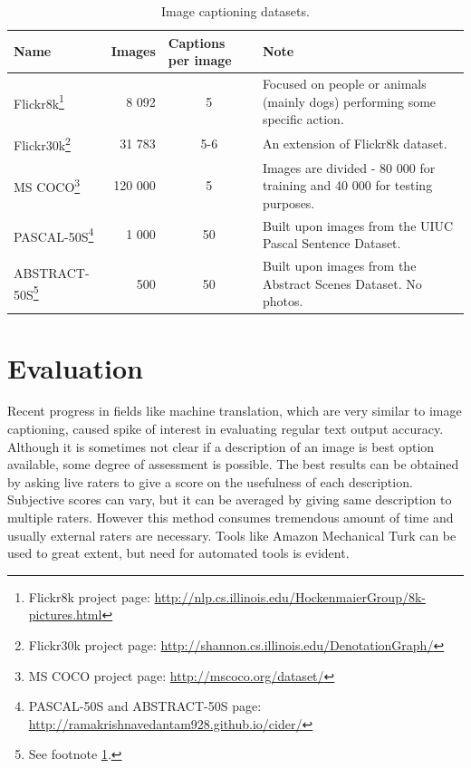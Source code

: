 \begin{center}
	\begin{longtable}{|l|m{2cm}|m{2cm}|m{4.7cm}|}			
		\caption{Image captioning datasets.} \label{tab:datasets} \\

	   	\hline
	   	\multicolumn{1}{|l|}{\textbf{Name}} & 
	   	\textbf{Images} & 
	   	\textbf{Captions per image} & 
	   	\textbf{Note} \\
	   	\hline \hline
		\endhead
		
	   	Flickr8k\footnote{Flickr8k project page: \url{http://nlp.cs.illinois.edu/HockenmaierGroup/8k-pictures.html}} &
		   	\multicolumn{1}{r|}{8 092} &
		   	\multicolumn{1}{c|}{5} &
		   	Focused on people or animals (mainly dogs) performing some specific action. \\ \hline
	   	Flickr30k\footnote{Flickr30k project page: \url{http://shannon.cs.illinois.edu/DenotationGraph/}} & 
		   	\multicolumn{1}{r|}{31 783} &
		   	\multicolumn{1}{c|}{5-6} &
		   	An extension of Flickr8k dataset. \\ \hline
	   	MS COCO\footnote{MS COCO project page: \url{http://mscoco.org/dataset/}} &
		   	\multicolumn{1}{r|}{120 000} &
		   	\multicolumn{1}{c|}{5} &
		   	Images are divided - 80 000 for training and 40 000 for testing purposes. \\ \hline
	   	PASCAL-50S\footnote{\label{ft:cider}PASCAL-50S and ABSTRACT-50S page: \url{http://ramakrishnavedantam928.github.io/cider/}} &
		   	\multicolumn{1}{r|}{1 000} &
		   	\multicolumn{1}{c|}{50} &
		   	Built upon images from the UIUC Pascal Sentence Dataset. \\ \hline
	   	ABSTRACT-50S\footnote{See footnote \ref{ft:cider}.} &
		   	\multicolumn{1}{r|}{500} &
		   	\multicolumn{1}{c|}{50} &
		   	Built upon images from the Abstract Scenes Dataset. No photos.\\ \hline
	\end{longtable}
\end{center}

	\section{Evaluation}
	\label{sec:evaluation}	
Recent progress in fields like machine translation, which are very similar to image captioning, caused spike of interest in evaluating regular text output accuracy. Although it is sometimes not clear if a description of an image is best option available, some degree of assessment is possible. The best results can be obtained by asking live raters to give a score on the usefulness of each description. Subjective scores can vary, but it can be averaged by giving same description to multiple raters. However this method consumes tremendous amount of time and usually external raters are necessary. Tools like Amazon Mechanical Turk can be used to great extent, but need for automated tools is evident.

